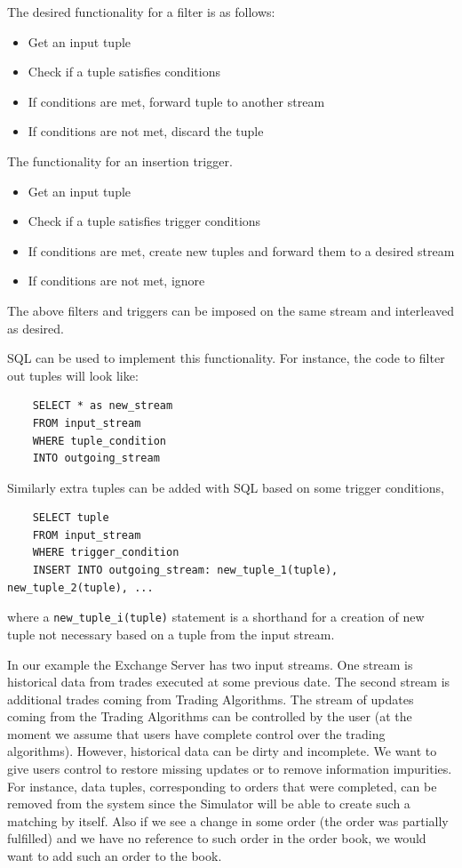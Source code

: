 \documentclass{article}
\begin{document}
The desired functionality for a filter is as follows:

\begin{itemize}
    \item Get an input tuple
    \item Check if a tuple satisfies conditions
    \item If conditions are met, forward tuple to another stream
    \item If conditions are not met, discard the tuple
\end{itemize}

The functionality for an insertion trigger.

\begin{itemize}
    \item Get an input tuple
    \item Check if a tuple satisfies trigger conditions
    \item If conditions are met, create new tuples and forward them to a desired stream
    \item If conditions are not met, ignore
\end{itemize}


\noindent The above filters and triggers can be imposed on the same stream and interleaved as desired.

SQL can be used to implement this functionality. For instance, the code to filter out tuples will look like:

\begin{verbatim}   
    SELECT * as new_stream
    FROM input_stream
    WHERE tuple_condition
    INTO outgoing_stream
\end{verbatim}

\noindent Similarly extra tuples can be added with SQL based on some trigger conditions,

\begin{verbatim}   
    SELECT tuple
    FROM input_stream
    WHERE trigger_condition
    INSERT INTO outgoing_stream: new_tuple_1(tuple), new_tuple_2(tuple), ...
\end{verbatim}

\noindent where a {\tt new\_tuple\_i(tuple)} statement is a shorthand for a creation of new tuple not necessary based on a tuple from the input stream.

In our example the Exchange Server has two input streams. One stream is historical data from trades executed at some previous date. The second stream is additional trades coming from Trading Algorithms. The stream of updates coming from the Trading Algorithms can be controlled by the user (at the moment we assume that users have complete control over the trading algorithms). However, historical data can be dirty and incomplete. We want to give users control to restore missing updates or to remove information impurities. For instance, data tuples, corresponding to orders that were completed, can be removed from the system since the Simulator will be able to create such a matching by itself. Also if we see a change in some order (the order was partially fulfilled) and we have no reference to such order in the order book, we would want to add such an order to the book.%
\end{document}
